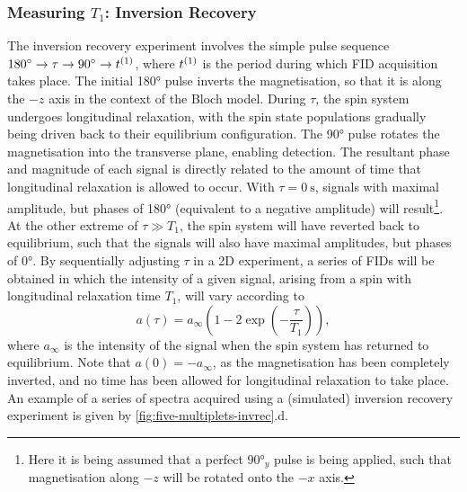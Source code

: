 \subsubsection{Measuring $T_1$: Inversion Recovery}
\label{subsec:invrec}
The inversion recovery experiment involves the simple pulse sequence $\ang{180}
\rightarrow \tau \rightarrow \ang{90} \rightarrow t^{(1)}$, where $t^{(1)}$ is the
period during which \ac{FID} acquisition takes place. The initial
\ang{180} pulse inverts the magnetisation, so that it is along the $-z$ axis in
the context of the Bloch model. During $\tau$, the spin system undergoes
longitudinal
relaxation, with the spin state populations gradually being driven back to
their equilibrium configuration. The \ang{90} pulse rotates the magnetisation
into the transverse plane, enabling detection. The resultant phase and
magnitude of each signal is directly related to the amount of time that
longitudinal relaxation is allowed to occur. With $\tau = \qty{0}{\second}$,
signals with maximal amplitude, but phases of \ang{180} (equivalent to a
negative amplitude) will result\footnote{
    Here it is being assumed that a perfect $\ang{90}_y$ pulse is being
    applied, such that magnetisation along $-z$ will be rotated onto the $-x$
    axis.
}. At the other extreme of $\tau \gg T_1$,
the spin system will have reverted
back to equilibrium, such that the signals will also have maximal amplitudes,
but phases of \ang{0}. By sequentially adjusting $\tau$ in a
\ac{2D} experiment, a series of \acp{FID} will be obtained in which the intensity
of a given signal, arising from a spin with longitudinal relaxation time $T_1$,
will vary according to
\begin{equation}
    a\left(\tau\right) = a_{\infty} \left( 1 - 2 \exp\left( -\frac{\tau}{T_1}\right) \right),
\end{equation}
where $a_{\infty}$ is the intensity of the signal when the spin system
has returned to equilibrium. Note that $a(0) = -a_{\infty}$, as the magnetisation
has been completely inverted, and no time has been allowed for longitudinal
relaxation to take place. An example of a series of spectra acquired using a
(simulated) inversion recovery experiment is given by
\cref{fig:five-multiplets-invrec}.d.

